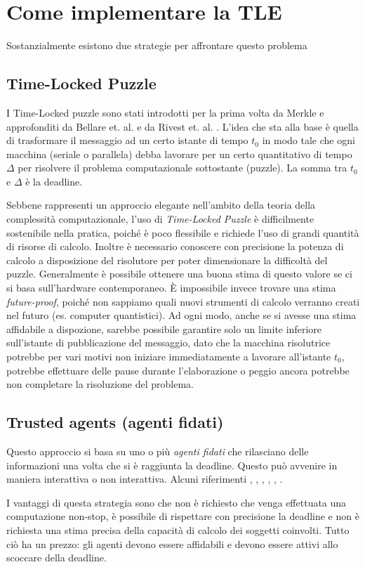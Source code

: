\section{Come implementare la TLE}
Sostanzialmente esistono due strategie
per affrontare questo problema

\subsection{Time-Locked Puzzle}
I Time-Locked puzzle sono stati introdotti per la prima volta
da Merkle \cite{Merkle:1978:SCO:359460.359473} e approfonditi
da Bellare et. al. \cite{Bellare:1996:EKE:888619}
e da Rivest et. al. \cite{Rivest96time-lockpuzzles}.
L'idea che sta alla base è quella di trasformare il messaggio ad un certo istante di tempo $ t_0 $
in modo tale che ogni macchina
(seriale o parallela) debba lavorare per un certo quantitativo di tempo $ \Delta $ per risolvere
il problema computazionale sottostante (puzzle). La somma tra $ t_0 $ e $ \Delta $ è la deadline.

Sebbene rappresenti un approccio elegante nell'ambito della teoria della complessità computazionale,
l'uso di \textit{Time-Locked Puzzle} è difficilmente sostenibile nella pratica,
poiché è poco flessibile e richiede l'uso di
grandi quantità di risorse di calcolo. Inoltre è necessario conoscere con
precisione la potenza di calcolo a disposizione del risolutore per poter
dimensionare la difficoltà del puzzle. Generalmente è possibile ottenere
una buona stima di questo valore se ci si basa sull'hardware contemporaneo. È impossibile
invece trovare una stima \textit{future-proof}, poiché non sappiamo quali nuovi strumenti di
calcolo verranno creati nel futuro (es. computer quantistici).
Ad ogni modo, anche se si avesse una stima affidabile a dispozione,
sarebbe possibile garantire solo un limite inferiore
sull'istante di pubblicazione del messaggio, dato che la macchina risolutrice potrebbe per vari motivi
non iniziare immediatamente a lavorare all'istante $ t_0 $,
potrebbe effettuare delle pause durante l'elaborazione
o peggio ancora potrebbe non completare la risoluzione del problema.


\subsection{Trusted agents (agenti fidati)}
\label{subsec:trusted-agents}
Questo approccio si basa su uno o più \textit{agenti fidati} che rilasciano
delle informazioni una volta che si è raggiunta la deadline. Questo può avvenire in
maniera interattiva o non interattiva. Alcuni riferimenti
\cite{time-capsule-signature}, \cite{10.1007/11602897_25}, \cite{10.1007/3-540-48910-X_6},
\cite{10.1007/11889663_17}, \cite{10.1007/978-3-642-15317-4_1}, \cite{10.1145/1330332.1330336}.

I vantaggi di questa strategia sono che non è richiesto che venga effettuata una computazione non-stop,
è possibile di rispettare con precisione la deadline e non è richiesta una stima precisa
della capacità di calcolo dei soggetti coinvolti. Tutto ciò ha un prezzo: gli agenti devono
essere affidabili e devono essere attivi allo scoccare della deadline.

